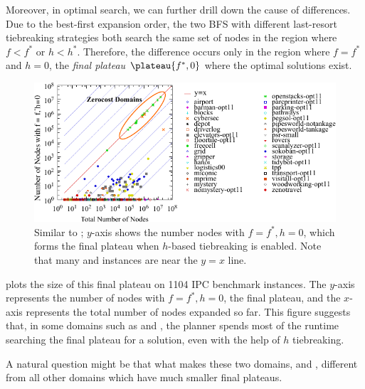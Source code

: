 Moreover, in optimal search, we can further drill down the cause of
differences.  Due to the best-first expansion order, the two BFS with
different last-resort tiebreaking strategies both search the same set of
nodes in the region where $f<f^*$ or $h<h^*$. Therefore, the difference
occurs only in the region where $f=f^*$ and $h=0$, the \emph{final
plateau} $\plateau{f^*,0}$ where the optimal solutions exist.

\begin{figure}[htbp]
   \centering
  \includegraphics{tables/aaai16-frontier/aaai16prelim3/lmcut_frontier-front.pdf}
  \caption{
  Similar to ; $y$-axis shows
  the number nodes with $f=f^*, h=0$, which forms the final
  plateau when $h$-based tiebreaking is enabled.
  Note that many  and  instances are near the $y=x$ line.
  }
  \label{fig:plateau}
\end{figure}

 plots the size of this final plateau on 1104 IPC
benchmark instances.  The $y$-axis represents the number of nodes with
$f=f^*, h=0$, the final plateau, and the $x$-axis represents the total
number of nodes expanded so far. This figure suggests that, in some
domains such as  and , the planner
spends most of the runtime searching the final plateau for a solution,
even with the help of $h$ tiebreaking.

A natural question might be that what makes these two domains,
 and , different from all other domains
which have much smaller final plateaus.
